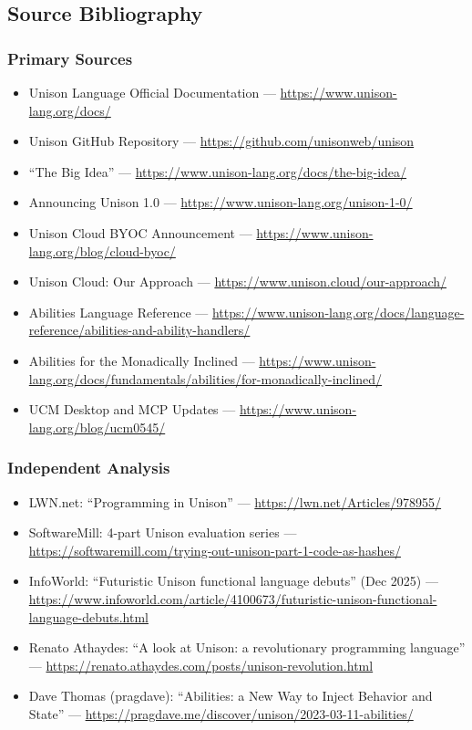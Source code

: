 \documentclass[11pt,letterpaper]{article}
\begin{document}
\subsection{Source Bibliography}

\subsubsection*{Primary Sources}
\begin{itemize}[leftmargin=2em]
  \item Unison Language Official Documentation --- \url{https://www.unison-lang.org/docs/}
  \item Unison GitHub Repository --- \url{https://github.com/unisonweb/unison}
  \item ``The Big Idea'' --- \url{https://www.unison-lang.org/docs/the-big-idea/}
  \item Announcing Unison 1.0 --- \url{https://www.unison-lang.org/unison-1-0/}
  \item Unison Cloud BYOC Announcement --- \url{https://www.unison-lang.org/blog/cloud-byoc/}
  \item Unison Cloud: Our Approach --- \url{https://www.unison.cloud/our-approach/}
  \item Abilities Language Reference --- \url{https://www.unison-lang.org/docs/language-reference/abilities-and-ability-handlers/}
  \item Abilities for the Monadically Inclined --- \url{https://www.unison-lang.org/docs/fundamentals/abilities/for-monadically-inclined/}
  \item UCM Desktop and MCP Updates --- \url{https://www.unison-lang.org/blog/ucm0545/}
\end{itemize}

\subsubsection*{Independent Analysis}
\begin{itemize}[leftmargin=2em]
  \item LWN.net: ``Programming in Unison'' --- \url{https://lwn.net/Articles/978955/}
  \item SoftwareMill: 4-part Unison evaluation series --- \url{https://softwaremill.com/trying-out-unison-part-1-code-as-hashes/}
  \item InfoWorld: ``Futuristic Unison functional language debuts'' (Dec 2025) --- \url{https://www.infoworld.com/article/4100673/futuristic-unison-functional-language-debuts.html}
  \item Renato Athaydes: ``A look at Unison: a revolutionary programming language'' --- \url{https://renato.athaydes.com/posts/unison-revolution.html}
  \item Dave Thomas (pragdave): ``Abilities: a New Way to Inject Behavior and State'' --- \url{https://pragdave.me/discover/unison/2023-03-11-abilities/}
\end{itemize}
\end{document}
